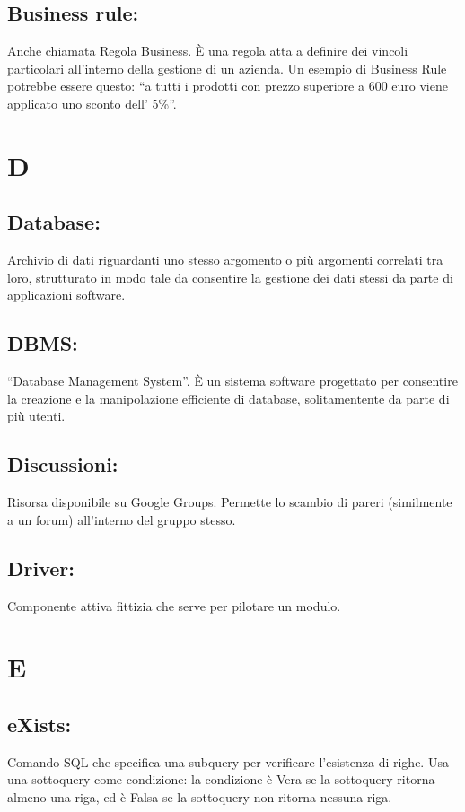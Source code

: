 \documentclass[11pt,titlepage,a4paper]{report}
\begin{document}
\section{Business rule:}
Anche chiamata Regola Business. \`E una regola atta a definire dei vincoli particolari all'interno della gestione di un azienda. Un esempio di Business Rule potrebbe essere questo: ``a tutti i prodotti con prezzo superiore a 600 euro  viene applicato uno sconto dell' 5\%''.

\chapter{D}
\section{Database:}
Archivio di dati riguardanti uno stesso argomento o pi\`u argomenti correlati tra loro, strutturato in modo tale da consentire la gestione dei dati stessi da parte di applicazioni software.
\section{DBMS:}
``Database Management System''. \`E un sistema software progettato per consentire la creazione e la manipolazione efficiente di database, solitamentente da parte di pi\`u utenti.
\section{Discussioni:}
Risorsa disponibile su Google Groups. Permette lo scambio di pareri (similmente a un forum) all'interno del gruppo stesso.
\section{Driver:}
Componente attiva fittizia che serve per pilotare un modulo.

\chapter{E}
\section{eXists:}
Comando SQL che specifica una subquery per verificare l'esistenza di righe. Usa una sottoquery come condizione: la condizione è Vera se la sottoquery ritorna almeno una riga, ed è Falsa se la sottoquery non ritorna nessuna riga.
\end{document}
